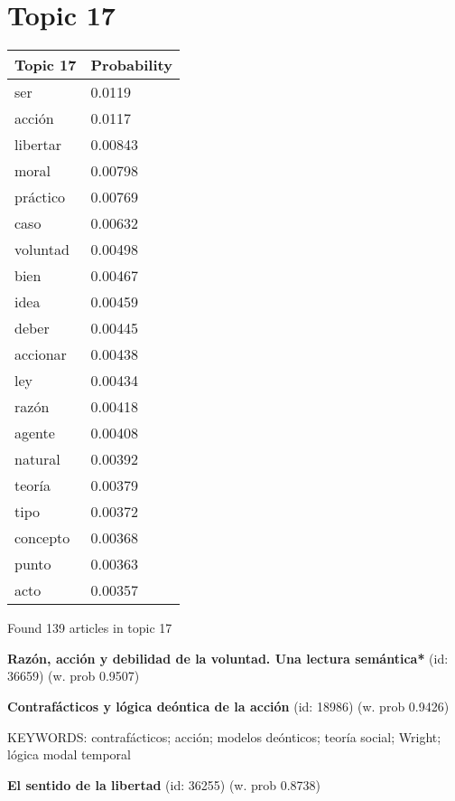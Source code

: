 \documentclass{article}
\begin{document}
\vfill
\newpage


\centering
\thispagestyle{empty}
\section*{Topic 17}\vfill
\begin{tabular}{ll}
\toprule
 Topic 17 & Probability \\
\midrule
      ser &      0.0119 \\
   acción &      0.0117 \\
 libertar &     0.00843 \\
    moral &     0.00798 \\
 práctico &     0.00769 \\
     caso &     0.00632 \\
 voluntad &     0.00498 \\
     bien &     0.00467 \\
     idea &     0.00459 \\
    deber &     0.00445 \\
 accionar &     0.00438 \\
      ley &     0.00434 \\
    razón &     0.00418 \\
   agente &     0.00408 \\
  natural &     0.00392 \\
   teoría &     0.00379 \\
     tipo &     0.00372 \\
 concepto &     0.00368 \\
    punto &     0.00363 \\
     acto &     0.00357 \\
\bottomrule
\end{tabular}

\vfill
Found 139 articles in topic 17
\vfill

\textbf{Razón, acción y debilidad de la voluntad. Una lectura semántica*} (id: 36659)
 (w. prob 0.9507)
\vfill

\textbf{Contrafácticos y lógica deóntica de la acción} (id: 18986)
 (w. prob 0.9426)


KEYWORDS:
contrafácticos; acción; modelos deónticos; teoría social; Wright; lógica modal temporal
\vfill

\textbf{El sentido de la libertad} (id: 36255)
 (w. prob 0.8738)

\vfill
\newpage


\centering
\thispagestyle{empty}
\end{document}
